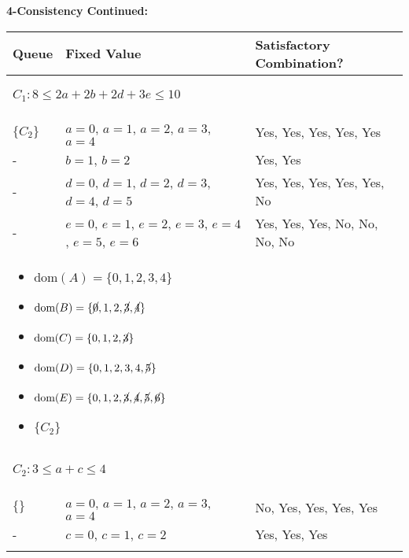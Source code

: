 \begin{example} \textbf{4-Consistency Continued:}
    \begin{center}
        \begin{tabular}{lll}
            \textbf{Queue} & \textbf{Fixed Value} & \textbf{Satisfactory Combination?} \\
            \toprule
            \multicolumn{3}{p{\linewidth}}{
            \begin{center}
                $C_1: 8 \leq 2a + 2b + 2d + 3e \leq 10$
            \end{center}} \\
            $\{C_2\}$ & $a=0$, $a=1$, $a=2$, $a=3$, $a=4$ & Yes, Yes, Yes, Yes, Yes \\
            - & $b=1$, $b=2$ & Yes, Yes \\
            - & $d=0$, $d=1$, $d=2$, $d=3$, $d=4$, $d=5$ & Yes, Yes, Yes, Yes, Yes, No \\
            - & $e=0$, $e=1$, $e=2$, $e=3$, $e=4$, $e=5$, $e=6$ & Yes, Yes, Yes, No, No, No, No \\
            \multicolumn{3}{p{\linewidth}}{
            \begin{itemize}
                \item $\text{dom}(A) = \{0, 1, 2, 3, 4\}$
                \item $\text{dom}(B) = \{\cancel{0}, 1, 2, \cancel{3}, \cancel{4}\} $
                \item $\text{dom}(C) = \{0, 1, 2, \cancel{3}\} $
                \item $\text{dom}(D) = \{0, 1, 2, 3, 4, \cancel{5}\} $
                \item $\text{dom}(E) = \{0, 1, 2, \cancel{3}, \cancel{4}, \cancel{5}, \cancel{6}\} $
                \item $\{C_2\}$
            \end{itemize}} \\
            \midrule
            \multicolumn{3}{p{\linewidth}}{
            \begin{center}
                $C_2: 3 \leq a + c \leq 4$
            \end{center}} \\
            $\{\}$ & $a=0$, $a=1$, $a=2$, $a=3$, $a=4$ & No, Yes, Yes, Yes, Yes \\
            - & $c=0$, $c=1$, $c=2$ & Yes, Yes, Yes \\
            \multicolumn{3}{p{\linewidth}}{
            \begin{itemize}

\end{itemize}}
\end{tabular}
\end{center}
\end{example}

